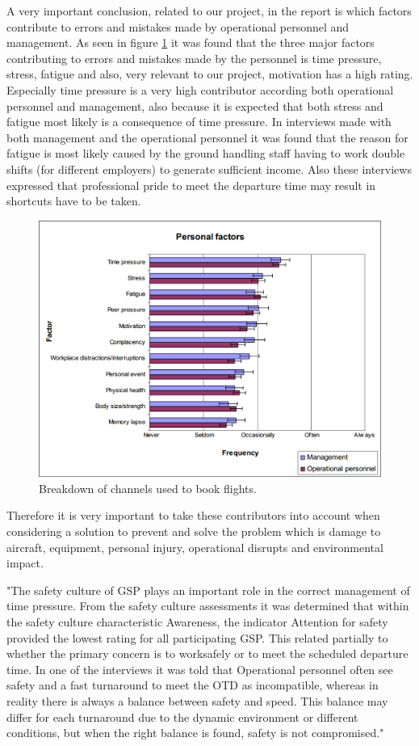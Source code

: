 A very important conclusion, related to our project, in the report is which factors contribute to errors and mistakes made by operational personnel and management. As seen in figure \ref{PersonalFactors} it was found that the three major factors contributing to errors and mistakes made by the personnel is time pressure, stress, fatigue and also, very relevant to our project, motivation has a high rating. Especially time pressure is a very high contributor according both operational personnel and management, also because it is expected that both stress and fatigue most likely is a consequence of time pressure. In interviews made with both management and the operational personnel it was found that the reason for fatigue is most likely caused by the ground handling staff having to work double shifts (for different employers) to generate sufficient income. Also these interviews expressed that professional pride to meet the departure time may result in shortcuts have to be taken.

\begin{figure}[!h]
\centering
\includegraphics[width=\textwidth]{Grafik/PersonalFactors}
\caption{Breakdown of channels used to book flights.}
\label{PersonalFactors}
\end{figure}

Therefore it is very important to take these contributors into account when considering a solution to prevent and solve the problem which is damage to aircraft, equipment, personal injury, operational disrupts and environmental impact.

"The safety culture of GSP plays an important role in the correct management of time pressure. From the safety culture assessments it was determined that within the safety culture characteristic Awareness, the indicator Attention for safety provided the lowest rating for all participating GSP. This related partially to whether the primary concern is to worksafely or to meet the scheduled departure time. In one of the interviews it was told that Operational personnel often see safety and a fast turnaround to meet the OTD as incompatible, whereas in reality there is always a balance between safety and speed. This balance may differ for each turnaround due to the dynamic environment or different conditions, but when the right balance is found, safety is not compromised."


